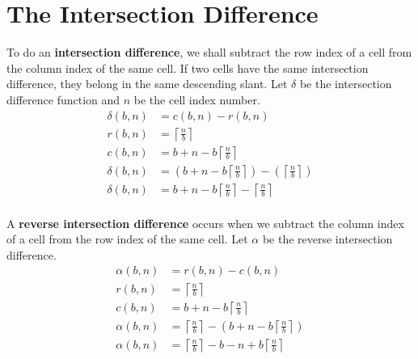 \documentclass[letterpaper, twoside,12pt]{book}
\begin{document}
    \section{The Intersection Difference} \label{intersection_diff}
    To do an \textbf{intersection difference}, we shall subtract the row index of a cell from the column index of the same cell. If two cells have the same intersection difference, they belong in the same descending slant. Let $\delta$ be the intersection difference function and $n$ be the cell index number.
    \begin{equation}
        \begin{split}
            \delta(b,n) &= c(b,n) - r(b,n)\\
            r(b,n) &= \left\lceil \frac{n}{b} \right\rceil \\
            c(b,n) &= b + n - b\left\lceil \frac{n}{b} \right\rceil \\
            \delta(b,n) &= (b + n - b\left\lceil \frac{n}{b} \right\rceil) - (\left\lceil \frac{n}{b} \right\rceil)\\
            \delta(b,n) &= b + n - b\left\lceil \frac{n}{b} \right\rceil - \left\lceil \frac{n}{b} \right\rceil\\
        \end{split}
    \end{equation}

    A \textbf{reverse intersection difference} occurs when we subtract the column index of a cell from the row index of the same cell. Let $\alpha$ be the reverse intersection difference.
    \begin{equation}
        \begin{split}
            \alpha(b,n) &= r(b,n) - c(b,n)\\
            r(b,n) &= \left\lceil \frac{n}{b} \right\rceil \\
            c(b,n) &= b + n - b\left\lceil \frac{n}{b} \right\rceil \\
            \alpha(b,n) &= \left\lceil \frac{n}{b} \right\rceil - (b + n - b\left\lceil \frac{n}{b} \right\rceil)\\
            \alpha(b,n) &= \left\lceil \frac{n}{b} \right\rceil - b - n + b\left\lceil \frac{n}{b} \right\rceil
        \end{split}
    \end{equation}
\end{document}
